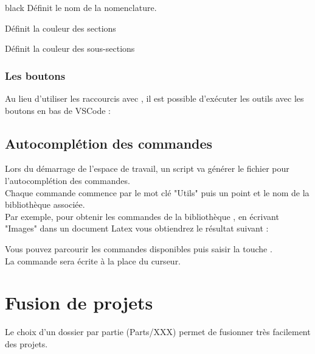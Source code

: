 {\begin{items}{black}{\faGear}
        Définit le nom de la nomenclature.

         

        \item  {}

        Définit la couleur des sections

        \item  {}

        Définit la couleur des sous-sections

    \end{items}

\subsection{Les boutons}

Au lieu d'utiliser les raccourcis avec , il est possible d’exécuter les outils avec les boutons en bas de VSCode : 




\section{Autocomplétion des commandes}

Lors du démarrage de l'espace de travail, un script va générer le fichier pour l'autocomplétion des commandes.\\
Chaque commande commence par le mot clé "Utils" puis un point et le nom de la bibliothèque associée. \\

Par exemple, pour obtenir les commandes de la bibliothèque , en écrivant "Images" dans un document Latex vous obtiendrez le résultat suivant : 


Vous pouvez parcourir les commandes disponibles puis saisir la touche .\\
La commande sera écrite à la place du curseur.\chapter{Fusion de projets}

Le choix d'un dossier par partie (Parts/XXX) permet de fusionner très facilement des projets.\\

}

